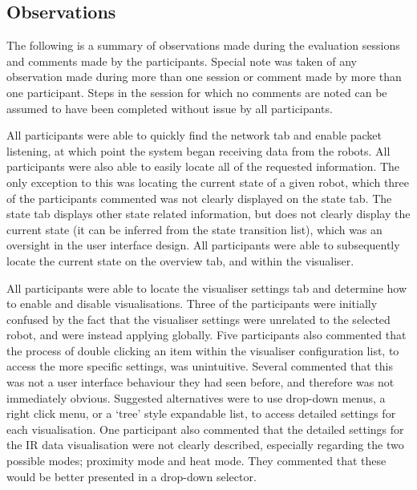 \subsection{Observations} \label{UserEvaluationObservations}
The following is a summary of observations made during the evaluation sessions and comments made by the participants. Special note was taken of any observation made during more than one session or comment made by more than one participant. Steps in the session for which no comments are noted can be assumed to have been completed without issue by all participants.

All participants were able to quickly find the network tab and enable packet listening, at which point the system began receiving data from the robots. All participants were also able to easily locate all of the requested information. The only exception to this was locating the current state of a given robot, which three of the participants commented was not clearly displayed on the state tab. The state tab displays other state related information, but does not clearly display the current state (it can be inferred from the state transition list), which was an oversight in the user interface design. All participants were able to subsequently locate the current state on the overview tab, and within the visualiser.

All participants were able to locate the visualiser settings tab and determine how to enable and disable visualisations. Three of the participants were initially confused by the fact that the visualiser settings were unrelated to the selected robot, and were instead applying globally. Five participants also commented that the process of double clicking an item within the visualiser configuration list, to access the more specific settings, was unintuitive. Several commented that this was not a user interface behaviour they had seen before, and therefore was not immediately obvious. Suggested alternatives were to use drop-down menus, a right click menu, or a `tree' style expandable list, to access detailed settings for each visualisation. One participant also commented that the detailed settings for the IR data visualisation were not clearly described, especially regarding the two possible modes; proximity mode and heat mode. They commented that these would be better presented in a drop-down selector.

